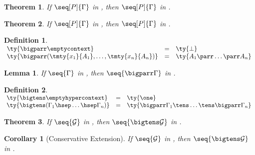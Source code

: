 \documentclass[submission,copyright,creativecommons]{eptcs}
\newtheorem{definition}{Definition}
\newtheorem{lemma}{Lemma}
\newtheorem{theorem}{Theorem}
\newtheorem{corollary}{Corollary}
\begin{document}
\begin{theorem}\label{thm:cp2hcp-typing}
  If $\seq[P]{\Gamma}$ in \cp, then $\seq[P]{\Gamma}$ in \hcp.
\end{theorem}
\begin{theorem}\label{thm:hcp2cp-typing}
  If $\seq[P]{\Gamma}$ in \hcp, then $\seq[P]{\Gamma}$ in \cp.
\end{theorem}
\begin{definition}\label{def:hcp-bigtens}
  \(\!%
  \begin{array}{lcl}
    \ty{\bigparr\emptycontext}
    & = & \ty{\bot}
    \\
    \ty{\bigparr(\tmty{x_1}{A_1}, \dots, \tmty{x_n}{A_n})}
    & = & \ty{A_1 \parr \dots \parr A_n}
  \end{array}
  \)
\end{definition}
\begin{lemma}\label{lem:hcp-bigparr}
  If $\seq{\Gamma}$ in \hcp, then $\seq{\bigparr\Gamma}$ in \hcp.
\end{lemma}
\begin{definition}\label{def:hcp-bigtens}
  \(\!%
  \begin{array}{lcl}
    \ty{\bigtens\emptyhypercontext}
    & = & \ty{\one}
    \\
    \ty{\bigtens(\Gamma_1 \hsep \dots \hsep \Gamma_n)}
    & = & \ty{\bigparr\Gamma_1 \tens \dots \tens \bigparr\Gamma_n}
  \end{array}
  \)
\end{definition}
\begin{theorem}\label{thm:hcp-bigtens}
  If $\seq{\mathcal{G}}$ in \hcp, then $\seq{\bigtens\mathcal{G}}$ in \hcp.
\end{theorem}
\begin{corollary}[Conservative Extension]
  If $\seq{\mathcal{G}}$ in \hcp, then $\seq{\bigtens\mathcal{G}}$ in \cp.
\end{corollary}
\end{document}
